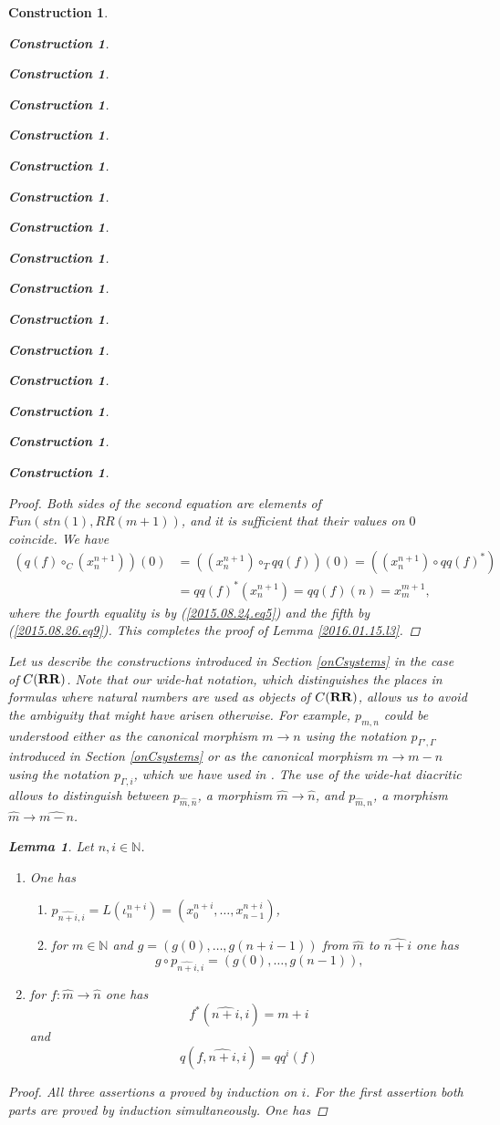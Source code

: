 \documentclass[12pt]{amsart}
\newtheorem{lemma}[proposition]{Lemma}
\numberwithin{proposition}{subsection}
\newtheorem{construction}[proposition]{Construction}
\newcommand{\llabel}[1]{\label{#1}}
\newcommand{\sr}{\rightarrow}
\newcommand{\nn}{{\mathbb N}}
\newcommand{\nat}{\nn}
\newcommand{\wh}{\widehat}
\newcommand{\mbind}[1]{{#1^*}}
\newcommand{\RR}{{\bf RR}}
\begin{document}
\begin{construction}
\begin{construction}
\begin{construction}
\begin{construction}
\begin{construction}
\begin{construction}
\begin{construction}
\begin{construction}
\begin{construction}
\begin{construction}
\begin{construction}
\begin{construction}
\begin{construction}
\begin{construction}
\begin{construction}
\begin{construction}
\begin{proof}
Both sides of the second equation are elements of $Fun(stn(1),RR(m+1))$, and it
is sufficient that their values on $0$ coincide. We have
%
\begin{equation*}
  \begin{split}
    (q(f)\circ_C (x_n^{n+1}))(0)&=((x_n^{n+1})\circ_T qq(f))(0)=((x_n^{n+1})\circ \mbind{qq(f)})
    \\
    &= \mbind{qq(f)}(x_n^{n+1})=qq(f)(n)=x_m^{m+1},
  \end{split}
\end{equation*}
%
where the fourth equality is by (\ref{2015.08.24.eq5}) and the fifth by
(\ref{2015.08.26.eq9}). This completes the proof of Lemma \ref{2016.01.15.l3}.
\end{proof}

%
Let us describe the constructions introduced in Section \ref{onCsystems} in the
case of $C(\RR)$. Note that our wide-hat notation, which distinguishes the places
in formulas where natural numbers are used as objects of $C(\RR)$, allows us to
avoid the ambiguity that might have arisen otherwise. For example, $p_{m,n}$
could be understood either as the canonical morphism $m\sr n$ using the
notation $p_{\Gamma',\Gamma}$ introduced in Section \ref{onCsystems} or as the
canonical morphism $m\sr m-n$ using the notation $p_{\Gamma,i}$, which we have
used in \cite{Csubsystems}.  The use of the wide-hat diacritic allows to
distinguish between $p_{\wh{m},\wh{n}}$, a morphism $\wh{m}\sr \wh{n}$, and
$p_{\wh{m},n}$, a morphism $\wh{m}\sr \wh{m-n}$.
%
\begin{lemma}
\llabel{2015.08.22.l6}
Let $n,i\in\nat$. 
%
\begin{enumerate}
\item One has
%
\begin{enumerate}
\item $p_{\wh{n+i},i}=L(\iota^{n+i}_{n})=(x_0^{n+i},\dots,x_{n-1}^{n+i})$,
\item for $m\in\nat$ and $g=(g(0),\dots,g(n+i-1))$ from $\wh{m}$ to $\wh{n+i}$ one has 
%
$$g\circ p_{\wh{n+i},i}=(g(0),\dots,g(n-1)),$$
%
\end{enumerate}
%
\item for $f:\wh{m}\sr \wh{n}$ one has
%
$$f^*(\wh{n+i},i)=m+i$$
%
and
%
$$q(f,\wh{n+i},i)=qq^i(f)$$
%
\end{enumerate}
\end{lemma}
%
\begin{proof}
All three assertions a proved by induction on $i$. For the first assertion both
parts are proved by induction simultaneously. One has

\end{proof}
\end{construction}
\end{construction}
\end{construction}
\end{construction}
\end{construction}
\end{construction}
\end{construction}
\end{construction}
\end{construction}
\end{construction}
\end{construction}
\end{construction}
\end{construction}
\end{construction}
\end{construction}
\end{construction}
\end{document}
